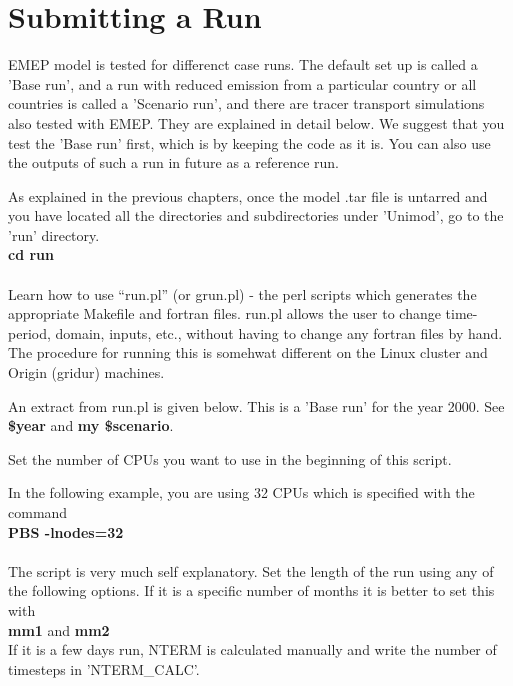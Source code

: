\chapter{Submitting a Run}

EMEP model is tested for differenct case runs.  The default set  up is
called a 'Base run', and a run with reduced emission from a particular
country or all countries is called a 'Scenario run', and there are
tracer transport simulations also tested with EMEP.  They are
explained in detail below.  We suggest that you test the 'Base run'
first, which is by keeping the code as it is.  You can also use the
outputs of such a run in future as a reference run.  

As explained in the previous chapters, once the model .tar file is
untarred and you have located all the directories and subdirectories
under 'Unimod',  go to the 'run' directory. \\

\textbf{cd run} \\
\\


Learn how to use ``run.pl'' (or grun.pl) - the perl scripts which generates
the appropriate Makefile and fortran files. run.pl allows
the user to change time-period, domain, inputs, etc., without
having to change any fortran files by hand. The procedure for running
this is somehwat different on the Linux cluster and  Origin (gridur)
machines.

An extract from run.pl  is given below.  This is a 'Base run' for the year
2000. See \textbf{\$year} and \textbf{my \$scenario}. 

 Set the number of CPUs you
want to use in the beginning of this script. 

In the following example, you are using 32 CPUs which is specified
with the command \\

\textbf{PBS -lnodes=32} \\
\\

The script is very much self explanatory.  Set the length of the run
using any of the following options.  If it is a specific number of months it
is better to set this with \\

\textbf{mm1} and \textbf{mm2}\\


If it is a few days run, NTERM is calculated manually and write the
number of timesteps in 'NTERM\_CALC'.  

